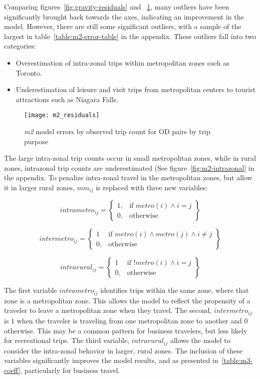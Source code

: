 Comparing figures~\ref{fig:gravity-residuals} and ~\ref{fig:m2_residuals}, many outliers have been significantly brought back towards the axes, indicating an improvement in the model. However, there are still some significant outliers, with a sample of the largest in table~\ref{table:m2-error-table} in the appendix. These outliers fall into two categories:
\begin{itemize}
\item Overestimation of intra-zonal trips within metropolitan zones such as Toronto.
\item Underestimation of leisure and visit trips from metropolitan centers to tourist attractions such as Niagara Falls.
\end{itemize}

\begin{figure}[H]
\centering
\texttt{[image: m2\_residuals]}
\caption{\textit{m2} model errors by observed trip count for OD pairs by trip purpose}
\label{fig:m2_residuals}
\end{figure}

The large intra-zonal trip counts occur in small metropolitan zones, while in rural zones, intrazonal trip counts are underestimated (See figure~\ref{fig:m2-intrazonal} in the appendix. To penalize intra-zonal travel in the metropolitan zones, but allow it in larger rural zones, $mm_{ij}$  is replaced with three new variables:

	$$	
	intrametro_{ij} = \left.
  \begin{cases}
    1, & \text{if } metro(i) \wedge i = j \\
    0, & \text{otherwise }
  \end{cases}
  \right\}
	$$
  
	$$	
	intermetro_{ij} = \left.
  \begin{cases}
    1 & \text{if } metro(i) \wedge metro(j) \wedge i \neq j \\
    0, & \text{otherwise } 
  \end{cases}
  \right\}
	$$  
	
	$$	
	intrarural_{ij} = \left.
  \begin{cases}
    1 & \text{if } !metro(i) \wedge i = j \\
    0, & \text{otherwise } 
  \end{cases}
  \right\}
	$$

The first variable $intrametro_{ij}$ identifies trips within the same zone, where that zone is a metropolitan zone. This allows the model to reflect the propensity of a traveler to leave a metropolitan zone when they travel. The second, $intermetro_{ij}$ is $1$ when the traveler is traveling from one metropolitan zone to another and $0$ otherwise. This may be a common pattern for business travelers, but less likely for recreational trips. The third variable, $intrarural_{ij}$ allows the model to consider the intra-zonal behavior in larger, rural zones. The inclusion of these variables significantly improves the model results, and as presented in~\ref{table:m3-coeff}, particularly for business travel.

